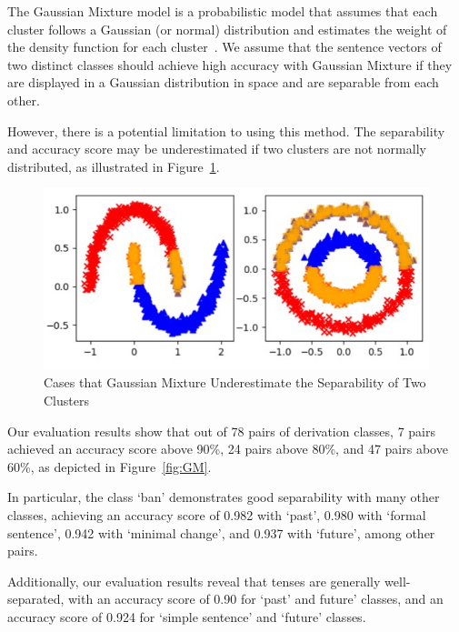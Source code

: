 \documentclass[11pt]{article}
\begin{document}
The Gaussian Mixture model is a probabilistic model that assumes that each
cluster follows a Gaussian (or normal) distribution and estimates the weight of
the density function for each cluster~\cite{reynolds2009gaussian,5298967}. We
assume that the sentence vectors of two distinct classes should achieve high
accuracy with Gaussian Mixture if they are displayed in a Gaussian distribution
in space and are separable from each other.

However, there is a potential limitation to using this method. The separability
and accuracy score may be underestimated if two clusters are not normally
distributed, as illustrated in Figure~\ref{fig:cirle}.


\begin{figure}[htp]
    \centering
    \includegraphics[scale=0.4]{figs/Circle.jpg}
    \caption{Cases that Gaussian Mixture Underestimate the Separability of Two
    Clusters}\label{fig:cirle}
\end{figure}


Our evaluation results show that out of 78 pairs of derivation classes, 7 pairs
achieved an accuracy score above 90\%, 24 pairs above 80\%, and 47 pairs above
60\%, as depicted in Figure~\ref{fig:GM}.

In particular, the class `ban' demonstrates good separability with many other
classes, achieving an accuracy score of 0.982 with `past', 0.980 with `formal
sentence', 0.942 with `minimal change', and 0.937 with `future', among other
pairs.

Additionally, our evaluation results reveal that tenses are generally
well-separated, with an accuracy score of 0.90 for `past' and future' classes,
and an accuracy score of 0.924 for `simple sentence' and `future' classes.
\end{document}
